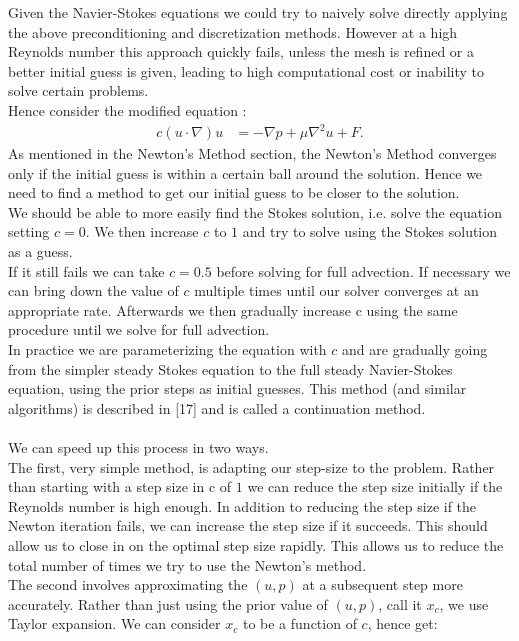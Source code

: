 \documentclass[11pt,twoside,a4paper]{article}
\begin{document}
Given the Navier-Stokes equations we could try to naively solve directly applying the above preconditioning and discretization methods. However at a high Reynolds number this approach quickly fails, unless the mesh is refined or a better initial guess is given, leading to high computational cost or inability to solve certain problems.\\
Hence consider the modified equation :
\begin{align}
c (u \cdot \nabla) u &= -\nabla p + \mu \nabla^2 u + F .
\end{align}
As mentioned in the Newton's Method section, the Newton's Method converges only if the initial guess is within a certain ball around the solution. Hence we need to find a method to get our initial guess to be closer to the solution.\\
We should be able to more easily find the Stokes solution, i.e. solve the equation setting $c = 0$. We then increase $c$ to $1$ and try to solve using the Stokes solution as a guess. \\
If it still fails we can take $c =0.5$ before solving for full advection. If necessary we can bring down the value of $c$ multiple times until our solver converges at an appropriate rate. Afterwards we then gradually increase c using the same procedure until we solve for full advection.\\
In practice we are parameterizing the equation with $c$ and are gradually going from the simpler steady Stokes equation to the full steady Navier-Stokes equation, using the prior steps as initial guesses. This method (and similar algorithms) is described in [17] and is called a continuation method.\\
\\
We can speed up this process in two ways.\\
The first, very simple method, is adapting our step-size to the problem. Rather than starting with a step size in c of $1$ we can reduce the step size initially if the Reynolds number is high enough. In addition to reducing the step size if the Newton iteration fails, we can increase the step size if it succeeds. This should allow us to close in on the optimal step size rapidly. This allows us to reduce the total number of times we try to use the Newton's method.\\
The second involves approximating the $(u,p)$ at a subsequent step more accurately. Rather than just using the prior value of $(u,p)$, call it $x_c$, we use Taylor expansion. We can consider $x_c$ to be a function of $c$, hence get:
\end{document}
